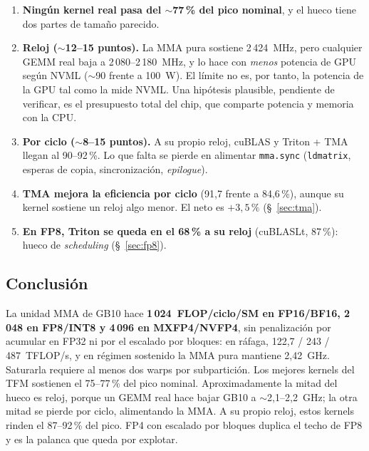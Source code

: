 \begin{enumerate}
  \item \textbf{Ningún kernel real pasa del $\sim$77\,\% del pico nominal}, y el hueco tiene dos
  partes de tamaño parecido.
  \item \textbf{Reloj ($\sim$12--15 puntos).} La MMA pura sostiene 2\,424~MHz, pero cualquier
  GEMM real baja a 2\,080--2\,180~MHz, y lo hace con \emph{menos} potencia de GPU según NVML
  ($\sim$90 frente a 100~W). El límite no es, por tanto, la potencia de la GPU tal como la mide
  NVML. Una hipótesis plausible, pendiente de verificar, es el presupuesto total del chip, que
  comparte potencia y memoria con la CPU.
  \item \textbf{Por ciclo ($\sim$8--15 puntos).} A su propio reloj, cuBLAS y Triton + TMA llegan
  al 90--92\,\%. Lo que falta se pierde en alimentar \texttt{mma.sync} (\texttt{ldmatrix}, esperas
  de copia, sincronización, \emph{epilogue}).
  \item \textbf{TMA mejora la eficiencia por ciclo} (91{,}7 frente a 84{,}6\,\%), aunque su kernel
  sostiene un reloj algo menor. El neto es $+3{,}5\,\%$ (§~\ref{sec:tma}).
  \item \textbf{En FP8, Triton se queda en el 68\,\% a su reloj} (cuBLASLt, 87\,\%): hueco de
  \emph{scheduling} (§~\ref{sec:fp8}).
\end{enumerate}

\subsection{Conclusión}

La unidad MMA de GB10 hace \textbf{1\,024~FLOP/ciclo/SM en FP16/BF16, 2\,048 en FP8/INT8 y
4\,096 en MXFP4/NVFP4}, sin penalización por acumular en FP32 ni por el escalado por bloques: en
ráfaga, 122{,}7 / 243 / 487~TFLOP/s, y en régimen sostenido la MMA pura mantiene 2{,}42~GHz.
Saturarla requiere al menos dos warps por subpartición. Los mejores kernels del TFM sostienen el
75--77\,\% del pico nominal. Aproximadamente la mitad del hueco es reloj, porque un GEMM real
hace bajar GB10 a $\sim$2{,}1--2{,}2~GHz; la otra mitad se pierde por ciclo, alimentando la MMA.
A su propio reloj, estos kernels rinden el 87--92\,\% del pico. FP4 con escalado por bloques
duplica el techo de FP8 y es la palanca que queda por explotar.
